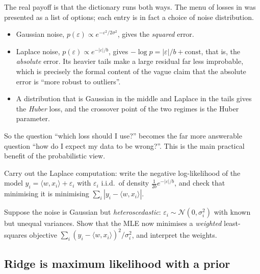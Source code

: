 \begin{remark}
The real payoff is that the dictionary runs both ways. The menu of losses in
 was presented as a list of options; each entry is in fact a
choice of noise distribution.
\begin{itemize}
    \item Gaussian noise, $p(\varepsilon) \propto e^{-\varepsilon^2/2\sigma^2}$, gives
    the \emph{squared} error.
    \item Laplace noise, $p(\varepsilon) \propto e^{-|\varepsilon|/b}$, gives
    $-\log p = |\varepsilon|/b + \text{const}$, that is, the \emph{absolute} error. Its
    heavier tails make a large residual far less improbable, which is precisely the
    formal content of the vague claim that the absolute error is ``more robust to
    outliers''.
    \item A distribution that is Gaussian in the middle and Laplace in the tails gives
    the \emph{Huber} loss, and the crossover point of the two regimes is the Huber
    parameter.
\end{itemize}
So the question ``which loss should I use?'' becomes the far more answerable question
``how do I expect my data to be wrong?''. This is the main practical benefit of the
probabilistic view.
\end{remark}

\begin{exercise}[$\star$]
Carry out the Laplace computation: write the negative log-likelihood of the model $y_i
= \langle w, x_i\rangle + \varepsilon_i$ with $\varepsilon_i$ i.i.d.\ of density
$\tfrac{1}{2b}e^{-|\varepsilon|/b}$, and check that minimising it is minimising
$\sum_i | y_i - \langle w, x_i\rangle |$.
\end{exercise}

\begin{exercise}[$\star\star$]
Suppose the noise is Gaussian but \emph{heteroscedastic}: $\varepsilon_i \sim
\mathcal{N}(0, \sigma_i^2)$ with known but unequal variances. Show that the MLE now
minimises a \emph{weighted} least-squares objective $\sum_i (y_i - \langle w,
x_i\rangle)^2 / \sigma_i^2$, and interpret the weights.
\end{exercise}


\subsection{Ridge is maximum likelihood with a prior}
\label{subsec:map}

